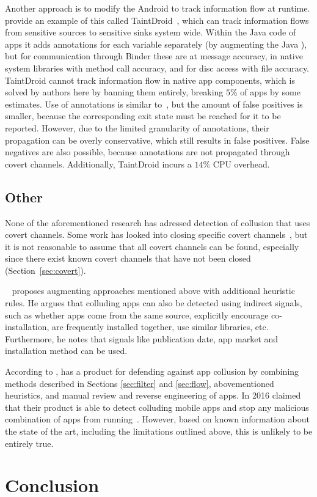 \documentclass[article, oneside]{aaltoseries}
\newcommand{\TODO}[1]{\todo[inline]{#1}}
\newcommand{\Sref}[1]{Section~\ref{#1}}
\renewcommand\gls\cgls
\begin{document}
Another approach is to modify the Android \gls{os} to track information flow at runtime. \citeauthor{Enck2014} provide an example of this called TaintDroid~\cite{Enck2014}, which can track information flows from sensitive sources to sensitive sinks system wide. Within the Java code of apps it adds annotations for each variable separately (by augmenting the Java \gls{vm}), but for communication through Binder these are at message accuracy, in native system libraries with method call accuracy, and for disc access with file accuracy. TaintDroid cannot track information flow in native app components, which is solved by authors here by banning them entirely, breaking $5\%$ of apps by some estimates. Use of annotations is similar to~\cite{Asavoae2018}, but the amount of false positives is smaller, because the corresponding exit state must be reached for it to be reported. However, due to the limited granularity of annotations, their propagation can be overly conservative, which still results in false positives. False negatives are also possible, because annotations are not propagated through covert channels. Additionally, TaintDroid incurs a $14\%$ CPU overhead.

\subsection{Other}
\label{sec:othermethods}

None of the aforementioned research has adressed detection of collusion that uses covert channels. Some work has looked into closing specific covert channels~\cite{nn2017,Qi2018}, but it is not reasonable to assume that all covert channels can be found, especially since there exist known covert channels that have not been closed (\Sref{sec:covert}).

\citeauthor{Muttik2016}~\cite{Muttik2016} proposes augmenting approaches mentioned above with additional heuristic rules. He argues that colluding apps can also be detected using indirect signals, such as whether apps come from the same source, explicitly encourage co-installation, are frequently installed together, use similar libraries, etc. Furthermore, he notes that signals like publication date, app market and installation method can be used. 

According to \citeauthor{Muttik2016}, \citeauthor{McAfee2016} has a product for defending against app collusion by combining methods described in Sections \ref{sec:filter} and \ref{sec:flow}, abovementioned heuristics, and manual review and reverse engineering of apps. In 2016 \citeauthor{McAfee2016} claimed that their product is able to detect colluding mobile apps and stop any malicious combination of apps from running~\cite{McAfee2016}. However, based on known information about the state of the art, including the limitations outlined above, this is unlikely to be entirely true.

\section{Conclusion}
\label{sec:conclusion}





\listoftodos
\TODO{remove list of todos}
\end{document}
